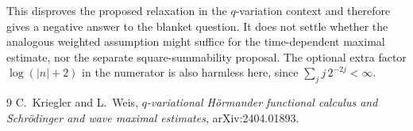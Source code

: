 \documentclass[11pt]{article}
\begin{document}
This disproves the proposed relaxation in the \(q\)-variation context and
therefore gives a negative answer to the blanket question.  It does not
settle whether the analogous weighted assumption might suffice for the
time-dependent maximal estimate, nor the separate square-summability
proposal.  The optional extra factor \(\log(|n|+2)\) in the numerator is
also harmless here, since \(\sum_j j\,2^{-2j}<\infty\).

\begin{thebibliography}{9}
 C.~Kriegler and L.~Weis,
\emph{\(q\)-variational H\"ormander functional calculus and Schr\"odinger
and wave maximal estimates}, arXiv:2404.01893.
\end{thebibliography}
\end{document}
